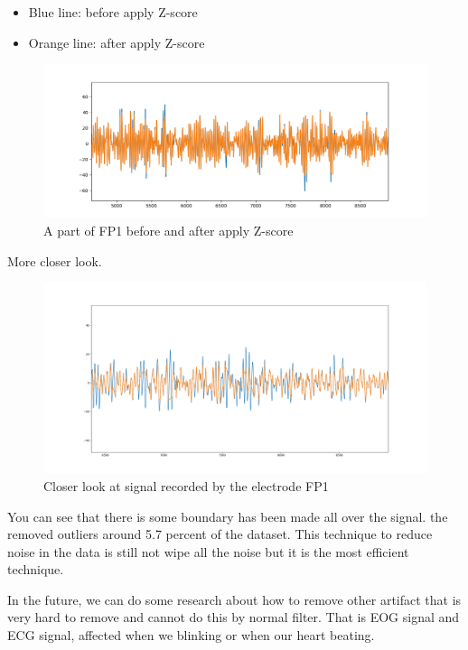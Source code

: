     \begin{itemize}
    \item Blue line: before apply Z-score
    \item Orange line: after apply Z-score
    \end{itemize}
    
    \begin{figure}[h]
        \centering
        \includegraphics[width = 1\textwidth]{images/fp1-2.png}
        \caption{A part of FP1 before and after apply Z-score}
        \label{fig:compare}
    \end{figure}
    
    More closer look.
    
    \begin{figure}[h]
        \centering
        \includegraphics[width = 1\textwidth]{images/closer.png}
        \caption{Closer look at signal recorded by the electrode FP1 }
        \label{fig:closer}
    \end{figure}
    
    You can see that there is some boundary has been made all over the signal. the removed outliers around 5.7 percent of the dataset. This technique to reduce noise in the data is still not wipe all the noise but it is the most efficient technique.
    
    In the future, we can do some research about how to remove other artifact that is very hard to remove and cannot do this by normal filter. That is EOG signal and ECG signal, affected when we blinking or when our heart beating.